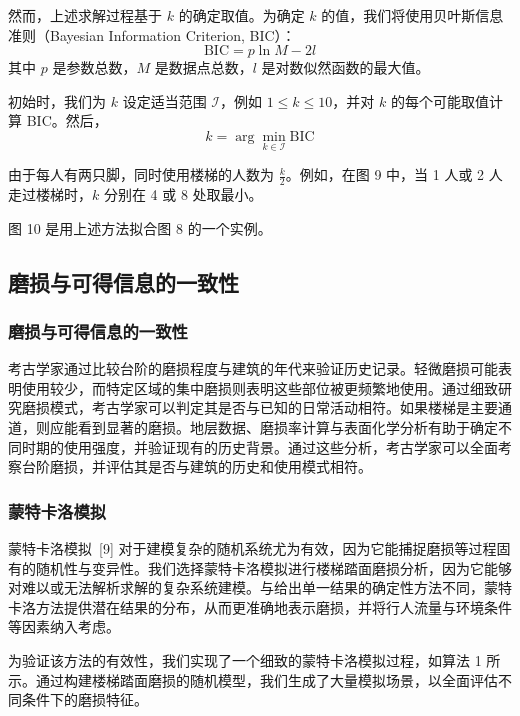\documentclass[11pt,a4paper]{ctexart}
\begin{document}
然而，上述求解过程基于 $k$ 的确定取值。为确定 $k$ 的值，我们将使用贝叶斯信息准则（Bayesian Information Criterion, BIC）：
\begin{equation}
\mathrm{BIC} = p\ln M - 2l
\end{equation}
其中 $p$ 是参数总数，$M$ 是数据点总数，$l$ 是对数似然函数的最大值。

初始时，我们为 $k$ 设定适当范围 $\mathcal{I}$，例如 $1\le k\le 10$，并对 $k$ 的每个可能取值计算 BIC。然后，
\begin{equation}
k = \arg\min_{k\in\mathcal{I}}\mathrm{BIC}
\end{equation}

由于每人有两只脚，同时使用楼梯的人数为 $\frac{k}{2}$。例如，在图 9 中，当 1 人或 2 人走过楼梯时，$k$ 分别在 4 或 8 处取最小。

图 10 是用上述方法拟合图 8 的一个实例。

\subsection{磨损与可得信息的一致性}

\subsubsection{磨损与可得信息的一致性}

考古学家通过比较台阶的磨损程度与建筑的年代来验证历史记录。轻微磨损可能表明使用较少，而特定区域的集中磨损则表明这些部位被更频繁地使用。通过细致研究磨损模式，考古学家可以判定其是否与已知的日常活动相符。如果楼梯是主要通道，则应能看到显著的磨损。地层数据、磨损率计算与表面化学分析有助于确定不同时期的使用强度，并验证现有的历史背景。通过这些分析，考古学家可以全面考察台阶磨损，并评估其是否与建筑的历史和使用模式相符。

\subsubsection{蒙特卡洛模拟}

蒙特卡洛模拟~[9] 对于建模复杂的随机系统尤为有效，因为它能捕捉磨损等过程固有的随机性与变异性。我们选择蒙特卡洛模拟进行楼梯踏面磨损分析，因为它能够对难以或无法解析求解的复杂系统建模。与给出单一结果的确定性方法不同，蒙特卡洛方法提供潜在结果的分布，从而更准确地表示磨损，并将行人流量与环境条件等因素纳入考虑。

为验证该方法的有效性，我们实现了一个细致的蒙特卡洛模拟过程，如算法 1 所示。通过构建楼梯踏面磨损的随机模型，我们生成了大量模拟场景，以全面评估不同条件下的磨损特征。
\end{document}
